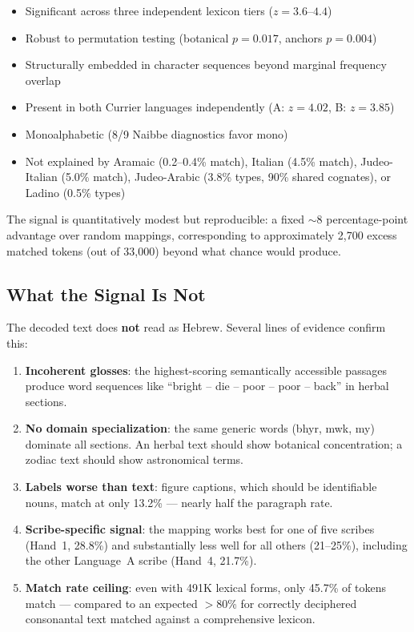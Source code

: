 \documentclass[11pt,a4paper]{article}
\newcommand{\heb}[1]{\textsf{#1}}
\begin{document}
\begin{itemize}
\item Significant across three independent lexicon tiers ($z=3.6$--$4.4$)
\item Robust to permutation testing (botanical $p=0.017$, anchors $p=0.004$)
\item Structurally embedded in character sequences beyond marginal frequency overlap
\item Present in both Currier languages independently (A: $z=4.02$, B: $z=3.85$)
\item Monoalphabetic (8/9 Naibbe diagnostics favor mono)
\item Not explained by Aramaic (0.2--0.4\% match), Italian (4.5\% match),
  Judeo-Italian (5.0\% match), Judeo-Arabic (3.8\% types, 90\% shared cognates),
  or Ladino (0.5\% types)
\end{itemize}

The signal is quantitatively modest but reproducible: a fixed $\sim$8
percentage-point advantage over random mappings, corresponding to
approximately 2,700 excess matched tokens (out of 33,000) beyond what
chance would produce.

\subsection{What the Signal Is Not}

The decoded text does \textbf{not} read as Hebrew. Several lines of evidence
confirm this:

\begin{enumerate}
\item \textbf{Incoherent glosses}: the highest-scoring semantically
accessible passages produce word sequences like ``bright -- die -- poor --
poor -- back'' in herbal sections.

\item \textbf{No domain specialization}: the same generic words (\heb{bhyr},
\heb{mwk}, \heb{my}) dominate all sections. An herbal text should show
botanical concentration; a zodiac text should show astronomical terms.

\item \textbf{Labels worse than text}: figure captions, which should be
identifiable nouns, match at only 13.2\% --- nearly half the paragraph rate.

\item \textbf{Scribe-specific signal}: the mapping works best for one of
five scribes (Hand~1, 28.8\%) and substantially less well for all others
(21--25\%), including the other Language~A scribe (Hand~4, 21.7\%).

\item \textbf{Match rate ceiling}: even with 491K lexical forms, only 45.7\%
of tokens match --- compared to an expected $>$80\% for correctly deciphered
consonantal text matched against a comprehensive lexicon.
\end{enumerate}
\end{document}
